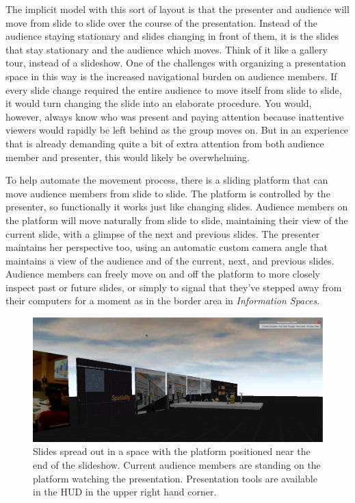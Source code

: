 The implicit model with this sort of layout is that the presenter and audience will move from slide to slide over the course of the presentation. Instead of the audience staying stationary and slides changing in front of them, it is the slides that stay stationary and the audience which moves. Think of it like a gallery tour, instead of a slideshow. One of the challenges with organizing a presentation space in this way is the increased navigational burden on audience members. If every slide change required the entire audience to move itself from slide to slide, it would turn changing the slide into an elaborate procedure. You would, however, always know who was present and paying attention because inattentive viewers would rapidly be left behind as the group moves on. But in an experience that is already demanding quite a bit of extra attention from both audience member and presenter, this would likely be overwhelming. 

To help automate the movement process, there is a sliding platform that can move audience members from slide to slide. The platform is controlled by the presenter, so functionally it works just like changing slides.  Audience members on the platform will move naturally from slide to slide, maintaining their view of the current slide, with a glimpse of the next and previous slides. The presenter maintains her perspective too, using an automatic custom camera angle that maintains a view of the audience and of the current, next, and previous slides. Audience members can freely move on and off the platform to more closely inspect past or future slides, or simply to signal that they've stepped away from their computers for a moment as in the border area in \emph{Information Spaces}. 

\begin{figure}[t]
	\includegraphics{figures/presentation_screenshot.png}
	\caption{Slides spread out in a space with the platform positioned near the end of the slideshow. Current audience members are standing on the platform watching the presentation. Presentation tools are available in the HUD in the upper right hand corner.}
	\label{fig:presentation_overview}
\end{figure}

